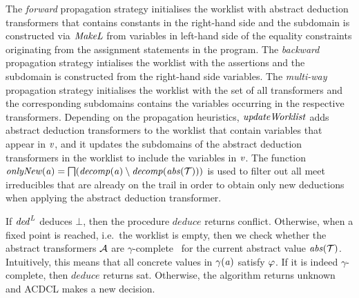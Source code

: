 The {\em forward} propagation strategy initialises the worklist with
abstract deduction transformers that contains constants in the
right-hand side and the subdomain is constructed via $\mathit{MakeL}$
from variables in left-hand side of the equality constraints
originating from the assignment statements in the program.
%
The {\em backward} propagation strategy intialises the worklist 
with the assertions and the subdomain is constructed from the 
right-hand side variables.
%
The {\em multi-way} propagation strategy initialises the worklist 
with the set of all transformers and the corresponding subdomains 
contains the variables occurring in the respective transformers.
%
Depending on the propagation heuristics, $\mathit{updateWorklist}$ adds
abstract deduction transformers to the worklist that contain variables
that appear in $\mathit{v}$, and it updates the subdomains of
the abstract deduction transformers in the worklist 
to include the variables in $\mathit{v}$.
%
The function
$\mathit{onlyNew}(\mathit{a})=\bigsqcap({\mathit{decomp}}(\mathit{a})\setminus{\mathit{decomp}}(\mathit{abs}(\mathcal{T})))$
is used to filter out all meet irreducibles that are already on the trail
in order to obtain only new deductions when applying the abstract deduction transformer.
%

If $\mathit{ded}^{\mathit{L}}$ deduces $\bot$, then 
the procedure $\mathit{deduce}$ returns \textsf{conflict}.
Otherwise, when a fixed point is reached, i.e.\ 
the worklist is empty, then we check whether
the abstract transformers $\mathcal{A}$ are $\gamma$-complete~\cite{dhk2013-popl} for the current abstract value $\mathit{abs}(\mathcal{T})$.
%
Intuitively, this means that all concrete values in 
$\gamma(\mathit{a})$ satisfy $\varphi$.  
%
If it is indeed 
$\gamma$-complete, then $\mathit{deduce}$ returns \textsf{sat}.  Otherwise, the 
algorithm returns \textsf{unknown} and ACDCL makes a new decision.    
  

